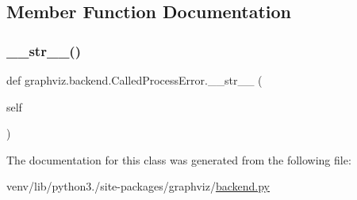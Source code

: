 \subsection{Member Function Documentation}
\mbox{\label{classgraphviz_1_1backend_1_1CalledProcessError_a10f4556ed0f6b654b097a6059687ce5c}} 
\subsubsection{\texorpdfstring{\+\_\+\+\_\+str\+\_\+\+\_\+()}{\_\_str\_\_()}}
{\footnotesize\ttfamily def graphviz.\+backend.\+Called\+Process\+Error.\+\_\+\+\_\+str\+\_\+\+\_\+ (\begin{DoxyParamCaption}\item[{}]{self }\end{DoxyParamCaption})}



The documentation for this class was generated from the following file\+:\begin{DoxyCompactItemize}
\item 
venv/lib/python3./site-\/packages/graphviz/\hyperlink{backend_8py}{backend.\+py}\end{DoxyCompactItemize}
